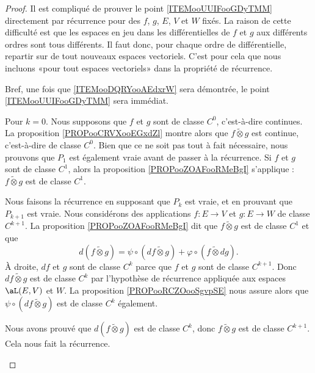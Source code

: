 \begin{proof}
	Il est compliqué de prouver le point \ref{ITEMooUUIFooGDyTMM} directement par récurrence pour des \( f\), \( g\), \( E\), \( V\) et \( W\) fixés. La raison de cette difficulté est que les espaces en jeu dans les différentielles de \( f\) et \( g\) aux différents ordres sont tous différents. Il faut donc, pour chaque ordre de différentielle, repartir sur de tout nouveaux espaces vectoriels. C'est pour cela que nous incluons «pour tout espaces vectoriels» dans la propriété de récurrence.

	Bref, une fois que \ref{ITEMooDQRYooAEdxrW} sera démontrée, le point \ref{ITEMooUUIFooGDyTMM} sera immédiat.

	\begin{subproof}
		\spitem[Pour \( k=0\)]
		Pour \( k=0\). Nous supposons que \( f\) et \( g\) sont de classe \( C^0\), c'est-à-dire continues. La proposition \ref{PROPooCRVXooEGxdZl} montre alors que \( f\tilde\otimes g\) est continue, c'est-à-dire de classe \( C^0\).
		\spitem[Pour \( k=1\)]
		Bien que ce ne soit pas tout à fait nécessaire, nous prouvons que \( P_1\) est également vraie avant de passer à la récurrence. Si \( f\) et \( g\) sont de classe \( C^1\), alors  la proposition \ref{PROPooZOAFooRMeBgI} s'applique : \( f\tilde\otimes g\) est de classe \( C^1\).

		\spitem[Pour \( k+1\)]
		Nous faisons la récurrence en supposant que \( P_k\) est vraie, et en prouvant que \( P_{k+1}\) est vraie. Nous considérons des applications  \( f\colon E\to V\) et \( g\colon E\to W\) de classe \( C^{k+1}\). La proposition \ref{PROPooZOAFooRMeBgI} dit que \( f\tilde\otimes g\) est de classe \( C^1\) et que
		\begin{equation}
			d(f\tilde\otimes g)=\psi\circ(df\tilde\otimes g)+\varphi\circ(f\tilde\otimes dg).
		\end{equation}
		À droite, \( df\) et \( g\) sont de classe \( C^k\) parce que \( f\) et \( g\) sont de classe \( C^{k+1}\). Donc \( df\tilde\otimes g\) est de classe \( C^k\) par l'hypothèse de récurrence appliquée aux espaces \( \aL(E,V)\) et \( W\). La proposition \ref{PROPooRCZOooSgvpSE} nous assure alors que \( \psi\circ(df\tilde\otimes g)\) est de classe \( C^k\) également.

		Nous avons prouvé que \( d(f\tilde\otimes g)\) est de classe \( C^k\), donc \( f\tilde\otimes g\) est de classe \( C^{k+1}\). Cela nous fait la récurrence.
	\end{subproof}
\end{proof}

